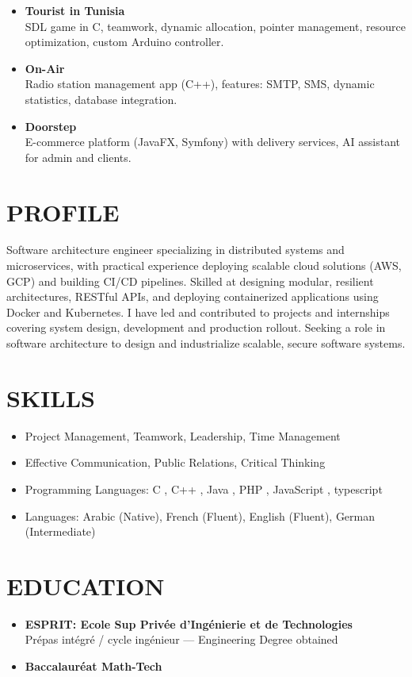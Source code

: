 \documentclass[paper=a4,fontsize=11pt]{scrartcl}
\newcommand{\sepspace}{\vspace*{0.5em}}
\newcommand{\NewPart}[1]{\section*{\uppercase{#1}}}
\begin{document}
\begin{itemize}
    \item \textbf{Tourist in Tunisia} \\
    SDL game in C, teamwork, dynamic allocation, pointer management, resource optimization, custom Arduino controller.

    \item \textbf{On-Air} \\
    Radio station management app (C++), features: SMTP, SMS, dynamic statistics, database integration.

    \item \textbf{Doorstep} \\
    E-commerce platform (JavaFX, Symfony) with delivery services, AI assistant for admin and clients.
\end{itemize}

\sepspace

\NewPart{Profile}
\noindent
Software architecture engineer specializing in distributed systems and microservices, with practical experience deploying scalable cloud solutions (AWS, GCP) and building CI/CD pipelines.
Skilled at designing modular, resilient architectures, RESTful APIs, and deploying containerized applications using Docker and Kubernetes.
I have led and contributed to projects and internships covering system design, development and production rollout. Seeking a role in software architecture to design and industrialize scalable, secure software systems.

\sepspace





\NewPart{Skills}
\begin{itemize}
    \item Project Management, Teamwork, Leadership, Time Management
    \item Effective Communication, Public Relations, Critical Thinking
    \item Programming Languages: C , C++ , Java , PHP , JavaScript , typescript
    \item Languages: Arabic (Native), French (Fluent), English (Fluent), German (Intermediate)
\end{itemize}

\sepspace

\NewPart{Education}
\begin{itemize}
    \item \textbf{ESPRIT: Ecole Sup Privée d'Ingénierie et de Technologies} \\
    Prépas intégré / cycle ingénieur --- Engineering Degree obtained
    \item \textbf{Baccalauréat Math-Tech} %
\end{itemize}
\end{document}
